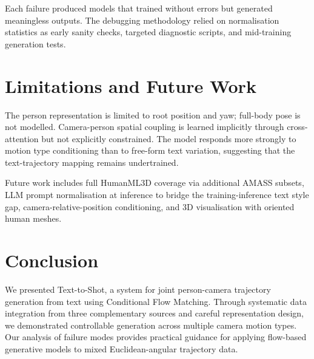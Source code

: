 \documentclass[10pt,twocolumn,letterpaper]{article}
\begin{document}
Each failure produced models that trained without errors but generated meaningless outputs. The debugging methodology relied on normalisation statistics as early sanity checks, targeted diagnostic scripts, and mid-training generation tests.

\section{Limitations and Future Work}

The person representation is limited to root position and yaw; full-body pose is not modelled. Camera-person spatial coupling is learned implicitly through cross-attention but not explicitly constrained. The model responds more strongly to motion type conditioning than to free-form text variation, suggesting that the text-trajectory mapping remains undertrained.

Future work includes full HumanML3D coverage via additional AMASS subsets, LLM prompt normalisation at inference to bridge the training-inference text style gap, camera-relative-position conditioning, and 3D visualisation with oriented human meshes.

\section{Conclusion}

We presented Text-to-Shot, a system for joint person-camera trajectory generation from text using Conditional Flow Matching. Through systematic data integration from three complementary sources and careful representation design, we demonstrated controllable generation across multiple camera motion types. Our analysis of failure modes provides practical guidance for applying flow-based generative models to mixed Euclidean-angular trajectory data.
\end{document}

